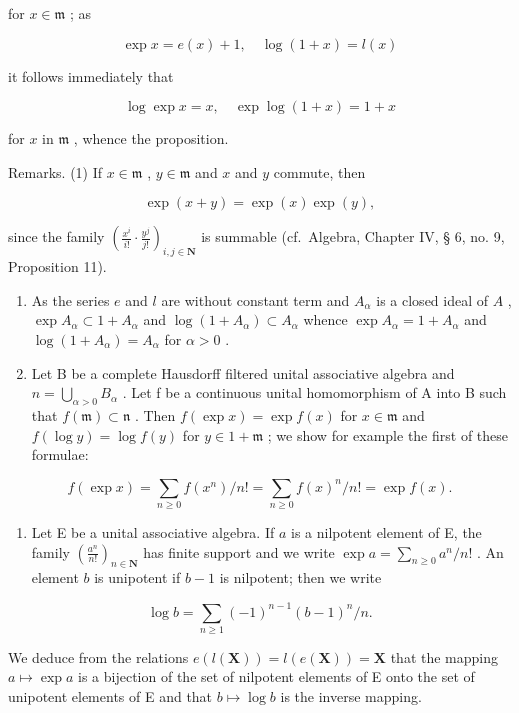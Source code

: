 for \(x\in \mathfrak{m}\) ; as

\[
\exp x = e (x) + 1, \quad \log (1 + x) = l (x)
\]

it follows immediately that

\[
\log \exp x = x, \quad \exp \log (1 + x) = 1 + x
\]

for \(x\) in \(\mathfrak{m}\) , whence the proposition.

Remarks. (1) If \(x \in \mathfrak{m}\) , \(y \in \mathfrak{m}\) and \(x\) and \(y\) commute, then

\[
\exp (x + y) = \exp (x) \exp (y),
\]

since the family \(\left(\frac{x^i}{i!}\cdot \frac{y^j}{j!}\right)_{i,j\in \mathbf{N}}\) is summable (cf.~Algebra, Chapter IV, § 6, no. 9, Proposition 11).

\begin{enumerate}
\def\labelenumi{(\arabic{enumi})}
\setcounter{enumi}{1}
\item
  As the series \(e\) and \(l\) are without constant term and \(A_{\alpha}\) is a closed ideal of \(A\) , \(\exp A_{\alpha} \subset 1 + A_{\alpha}\) and \(\log (1 + A_{\alpha}) \subset A_{\alpha}\) whence \(\exp A_{\alpha} = 1 + A_{\alpha}\) and \(\log (1 + A_{\alpha}) = A_{\alpha}\) for \(\alpha > 0\) .
\item
  Let B be a complete Hausdorff filtered unital associative algebra and \(n = \bigcup_{\alpha > 0} B_{\alpha}\) . Let f be a continuous unital homomorphism of A into B such that \(f(\mathfrak{m}) \subset \mathfrak{n}\) . Then \(f(\exp x) = \exp f(x)\) for \(x \in \mathfrak{m}\) and \(f(\log y) = \log f(y)\) for \(y \in 1 + \mathfrak{m}\) ; we show for example the first of these formulae:
\end{enumerate}

\[
f (\exp x) = \sum_ {n \geqslant 0} f (x ^ {n}) / n! = \sum_ {n \geqslant 0} f (x) ^ {n} / n! = \exp f (x).
\]

\begin{enumerate}
\def\labelenumi{(\arabic{enumi})}
\setcounter{enumi}{3}
\tightlist
\item
  Let E be a unital associative algebra. If \(a\) is a nilpotent element of E, the family \(\left(\frac{a^n}{n!}\right)_{n\in \mathbf{N}}\) has finite support and we write \(\exp a = \sum_{n\geqslant 0}a^n /n!\) . An element \(b\) is unipotent if \(b - 1\) is nilpotent; then we write
\end{enumerate}

\[
\log b = \sum_ {n \geqslant 1} (- 1) ^ {n - 1} (b - 1) ^ {n} / n.
\]

We deduce from the relations \(e(l(\mathbf{X})) = l(e(\mathbf{X})) = \mathbf{X}\) that the mapping \(a \mapsto \exp a\) is a bijection of the set of nilpotent elements of E onto the set of unipotent elements of E and that \(b \mapsto \log b\) is the inverse mapping.

